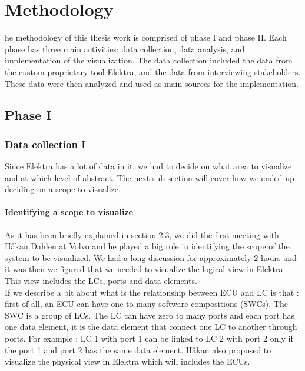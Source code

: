 \chapter{Methodology}
\label{methodology}
\lettrine[findent=2pt]{}{ }he methodology of this thesis work is comprised of phase I and phase II. Each phase has three main activities: data collection, data analysis, and implementation of the visualization. The data collection included the data from the custom proprietary tool Elektra, and the data from interviewing stakeholders. These data were then analyzed and used as main sources for the implementation.

\section{Phase I}

\subsection{Data collection I}
Since Elektra has a lot of data in it, we had to decide on what area to visualize and at which level of abstract. The next sub-section will cover how we ended up deciding on a scope to visualize.

\subsubsection{Identifying a scope to visualize}
As it has been briefly explained in section 2.3, we did the first meeting with Håkan Dahlen at Volvo and he played a big role in identifying the scope of the system to be visualized. We had a long discussion for approximately 2 hours and it was then we figured that we needed to visualize the logical view in Elektra. This view includes the LCs, ports and data elements. \\

If we describe a bit about what is the relationship between ECU and LC is that : first of all, an ECU can have one to many software compositions (SWCs). The SWC is a group of LCs. The LC can have zero to many ports and each port has one data element, it is the data element that connect one LC to another through ports. For example : LC 1 with port 1 can be linked to LC 2 with port 2 only if the port 1 and port 2 has the same data element. Håkan also proposed to visualize the physical view in Elektra which will includes the ECUs.\\

